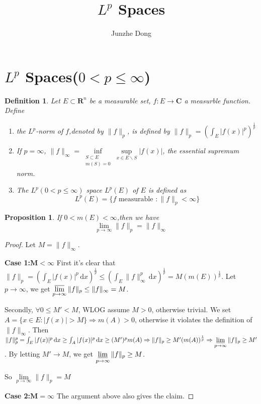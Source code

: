 \documentclass{article}
\title{$L^p$ Spaces}
\author{Junzhe Dong}
\begin{document}
\maketitle
\newcommand{\R}{\mathbf{R}}
\newcommand{\dd}{\,\mathrm{d}}
\newcommand{\st}{\text{ s.t. }}


\newtheorem{Thm}{Theorem}[section]
\newtheorem{Lemma}[Thm]{Lemma}
\newtheorem{Prop}[Thm]{Proposition}
\newtheorem{Cor}[Thm]{Corollary}
\newtheorem{Def}{Definition}[section]
\newtheorem{Rmk}{Remark}[section]
\newtheorem{Eg}{Example}[section]
\newenvironment{solution}{\begin{proof}[Solution]}{\end{proof}}


\section{$L^p$ Spaces($0<p\leq \infty$)}
\begin{Def}
Let $E\subset\R^n$ be a measurable set, $f:E\to\mathbf{C}$ a measurble function. Define 
\begin{enumerate}
\item the $L^p$-norm of $f$,denoted by $\|f\|_p$, is defined by $\|f\|_p=(\int_E|f(x)|^p)^{\frac{1}{p}}$
\item If $p=\infty$, $\|f\|_\infty=\inf\limits_{\substack{S\subset E\\m(S)=0}}\sup\limits_{x\in E\backslash S}|f(x)|$, the essential supremum norm.
\item The $L^p(0<p\leq\infty)$ space $L^p(E)$ of $E$ is defined as
\[L^p(E)=\{f\text{ measurable }:\|f\|_p<\infty\}\] 
\end{enumerate}
\end{Def}

\begin{Prop}
If $0<m(E)<\infty$,then we have 
\[\lim_{p\to\infty}\|f\|_p=\|f\|_{\infty}\]
\end{Prop}
\begin{proof}
Let $M=\|f\|_{\infty}$. 

\textbf{Case 1:$\bm{M<\infty}$} First it's clear that $\|f\|_p=(\int_E|f(x)|^p\dd x)^{\frac 1 p}\leq (\int_E\|f\|_\infty^p\dd x)^{\frac 1 p}=M(m(E))^{\frac 1 p}$. Let $p\to\infty$, we get $\varlimsup\limits_{p\to\infty}\|f\|_p\leq \|f\|_\infty=M$.

Secondly, $\forall 0\leq M'<M$, WLOG assume $M>0$, otherwise trivial. We set $A=\{x\in E:|f(x)|>M\}\Rightarrow m(A)>0$, otherwise it violates the definition of $\|f\|_\infty$. Then $\|f\|^p_p=\int_E|f(x)|^p\dd x\geq \int_A|f(x)|^p\dd x\geq (M')^pm(A)\Rightarrow \|f\|_p\geq M'(m(A))^{\frac 1 p}\Rightarrow \varliminf\limits_{p\to\infty}\|f\|_p\geq M'$. By letting $M'\to M$, we get $\varliminf\limits_{p\to\infty}\|f\|_p\geq M$.

So $\lim\limits_{p\to\infty}\|f\|_p=M$

\textbf{Case 2:$\bm{M=\infty}$} The argument above also gives the claim.
\end{proof}
\end{document}

